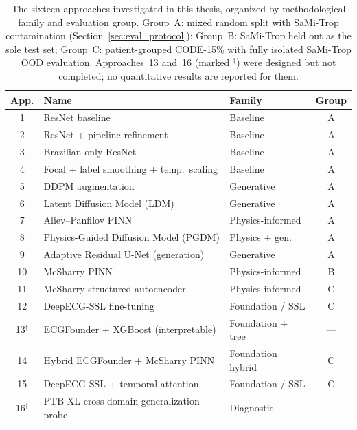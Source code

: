 \begin{table}[htbp]
\centering
\small
\caption[Sixteen investigated models grouped by evaluation method]{The sixteen approaches investigated in this thesis, organized by methodological family and evaluation group. Group~A: mixed random split with SaMi-Trop contamination (Section~\ref{sec:eval_protocol}); Group~B: SaMi-Trop held out as the sole test set; Group~C: patient-grouped CODE-15\% with fully isolated SaMi-Trop OOD evaluation. Approaches~13 and~16 (marked $^{\dagger}$) were designed but not completed; no quantitative results are reported for them.}
\label{tab:all_approaches}
\begin{tabular}{c l l c}
\hline
\textbf{App.} & \textbf{Name} & \textbf{Family} & \textbf{Group} \\
\hline
 1   & ResNet baseline                                & Baseline           & A \\
 2   & ResNet + pipeline refinement                   & Baseline           & A \\
 3   & Brazilian-only ResNet                          & Baseline           & A \\
 4   & Focal + label smoothing + temp.\ scaling       & Baseline           & A \\
 5   & DDPM augmentation                              & Generative         & A \\
 6   & Latent Diffusion Model (LDM)                   & Generative         & A \\
 7   & Aliev--Panfilov PINN                           & Physics-informed   & A \\
 8   & Physics-Guided Diffusion Model (PGDM)          & Physics + gen.     & A \\
 9   & Adaptive Residual U-Net (generation)           & Generative         & A \\
10   & McSharry PINN                                  & Physics-informed   & B \\
11   & McSharry structured autoencoder                & Physics-informed   & C \\
12   & DeepECG-SSL fine-tuning                        & Foundation / SSL   & C \\
13$^{\dagger}$ & ECGFounder + XGBoost (interpretable) & Foundation + tree  & --- \\
14   & Hybrid ECGFounder + McSharry PINN              & Foundation hybrid  & C \\
15   & DeepECG-SSL + temporal attention               & Foundation / SSL   & C \\
16$^{\dagger}$ & PTB-XL cross-domain generalization probe & Diagnostic     & --- \\
\hline
\end{tabular}
\end{table}

